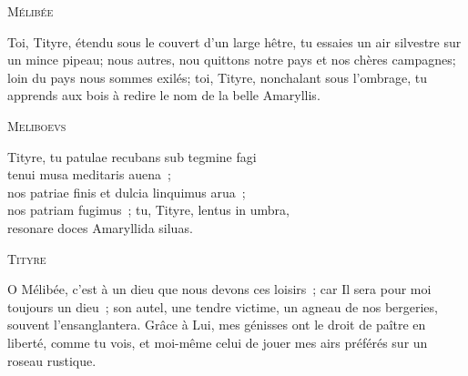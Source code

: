 \documentclass[a4paper,12pt,twoside, titlepage]{book}
\begin{document}
\begin{alignment}


\begin{translation}

\begin{center}\textsc{Mélibée}\end{center}

Toi, Tityre, étendu sous le couvert d'un large hêtre, tu essaies un air silvestre sur un mince pipeau; nous autres, nou quittons notre pays et nos chères campagnes; loin du pays nous sommes exilés; toi, Tityre, nonchalant sous l'ombrage, tu apprends aux bois à redire le nom de la belle Amaryllis. 

\end{translation}

\begin{edition}

\begin{center}\textsc{Meliboevs}\end{center}
\begin{ekdverse}
Tityre, tu patulae recubans sub tegmine fagi\\
tenui musa meditaris auena~;\\
nos patriae finis et dulcia linquimus arua~;\\
nos patriam fugimus~; tu, Tityre, lentus in umbra,\\
 resonare doces Amaryllida siluas.\\
\end{ekdverse}

\end{edition}


\begin{translation}

\begin{center}\textsc{Tityre}\end{center}


O Mélibée, c'est à un dieu que nous devons ces loisirs~; car Il sera pour moi toujours un dieu~; son autel, une tendre victime, un agneau de nos bergeries, souvent l'ensanglantera. Grâce à Lui, mes génisses ont le droit de paître en liberté, comme tu vois, et moi-même celui de jouer mes airs préférés sur un roseau rustique.


\end{translation}
\end{alignment}
\end{document}
